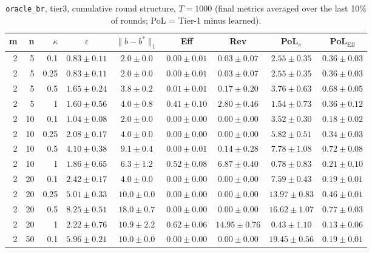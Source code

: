 \begin{table}[htbp]
\centering
\scriptsize
\caption{\texttt{oracle\_br}, tier3, cumulative round structure, $T=1000$ (final metrics averaged over the last 10\% of rounds; PoL = Tier-1 minus learned).}
\label{tab:tier3_oracle_br_cumulative}
\begin{tabular}{@{}rrrcccccc@{}}
\toprule
m & n & $\kappa$ & $\varepsilon$ & $\|b-b^*\|_1$ & Eff & Rev & PoL$_\pi$ & PoL$_\mathrm{Eff}$ \\
\midrule
2 & 5 & 0.1 & $0.83 \pm 0.11$ & $2.0 \pm 0.0$ & $0.00 \pm 0.01$ & $0.03 \pm 0.07$ & $2.55 \pm 0.35$ & $0.36 \pm 0.03$ \\
2 & 5 & 0.25 & $0.83 \pm 0.11$ & $2.0 \pm 0.0$ & $0.00 \pm 0.01$ & $0.03 \pm 0.07$ & $2.55 \pm 0.35$ & $0.36 \pm 0.03$ \\
2 & 5 & 0.5 & $1.65 \pm 0.24$ & $3.8 \pm 0.2$ & $0.01 \pm 0.01$ & $0.17 \pm 0.20$ & $3.76 \pm 0.63$ & $0.68 \pm 0.05$ \\
2 & 5 & 1 & $1.60 \pm 0.56$ & $4.0 \pm 0.8$ & $0.41 \pm 0.10$ & $2.80 \pm 0.46$ & $1.54 \pm 0.73$ & $0.36 \pm 0.12$ \\
2 & 10 & 0.1 & $1.04 \pm 0.08$ & $2.0 \pm 0.0$ & $0.00 \pm 0.00$ & $0.00 \pm 0.00$ & $3.52 \pm 0.30$ & $0.18 \pm 0.02$ \\
2 & 10 & 0.25 & $2.08 \pm 0.17$ & $4.0 \pm 0.0$ & $0.00 \pm 0.00$ & $0.00 \pm 0.00$ & $5.82 \pm 0.51$ & $0.34 \pm 0.03$ \\
2 & 10 & 0.5 & $4.10 \pm 0.38$ & $9.1 \pm 0.4$ & $0.00 \pm 0.01$ & $0.14 \pm 0.28$ & $7.78 \pm 1.08$ & $0.72 \pm 0.08$ \\
2 & 10 & 1 & $1.86 \pm 0.65$ & $6.3 \pm 1.2$ & $0.52 \pm 0.08$ & $6.87 \pm 0.40$ & $0.78 \pm 0.83$ & $0.21 \pm 0.10$ \\
2 & 20 & 0.1 & $2.42 \pm 0.17$ & $4.0 \pm 0.0$ & $0.00 \pm 0.00$ & $0.00 \pm 0.00$ & $7.59 \pm 0.43$ & $0.19 \pm 0.01$ \\
2 & 20 & 0.25 & $5.01 \pm 0.33$ & $10.0 \pm 0.0$ & $0.00 \pm 0.00$ & $0.00 \pm 0.00$ & $13.97 \pm 0.83$ & $0.46 \pm 0.01$ \\
2 & 20 & 0.5 & $8.25 \pm 0.51$ & $18.0 \pm 0.7$ & $0.00 \pm 0.00$ & $0.00 \pm 0.00$ & $16.62 \pm 1.07$ & $0.77 \pm 0.03$ \\
2 & 20 & 1 & $2.22 \pm 0.76$ & $10.9 \pm 2.2$ & $0.62 \pm 0.06$ & $14.95 \pm 0.76$ & $0.43 \pm 1.10$ & $0.13 \pm 0.06$ \\
2 & 50 & 0.1 & $5.96 \pm 0.21$ & $10.0 \pm 0.0$ & $0.00 \pm 0.00$ & $0.00 \pm 0.00$ & $19.45 \pm 0.56$ & $0.19 \pm 0.01$ \\

\end{tabular}
\end{table}
